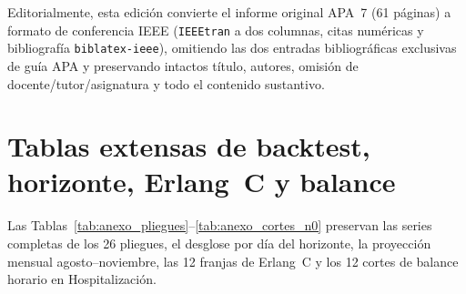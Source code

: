 Editorialmente, esta edición convierte el informe original APA~7 (61 páginas) a formato de conferencia IEEE (\texttt{IEEEtran} a dos columnas, citas numéricas y bibliografía \texttt{biblatex-ieee}), omitiendo las dos entradas bibliográficas exclusivas de guía APA y preservando intactos título, autores, omisión de docente/tutor/asignatura y todo el contenido sustantivo.

\FloatBarrier

\section{Tablas extensas de backtest, horizonte, Erlang~C y balance}
\label{app:tablas_extensas}

Las Tablas~\ref{tab:anexo_pliegues}--\ref{tab:anexo_cortes_n0} preservan las series completas de los 26 pliegues, el desglose por día del horizonte, la proyección mensual agosto--noviembre, las 12 franjas de Erlang~C y los 12 cortes de balance horario en Hospitalización.

